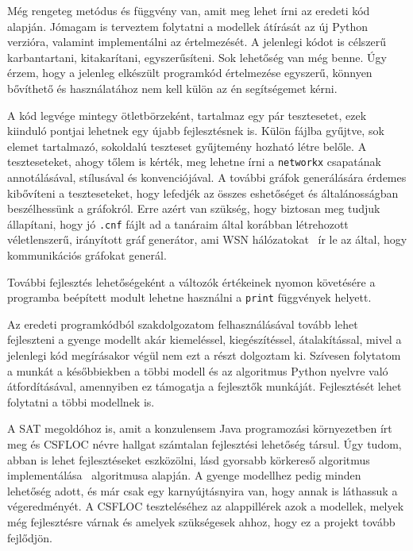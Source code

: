 \documentclass[
]{thesis-ekf}
\theoremstyle{definition}
\theoremstyle{remark}
\begin{document}
	Még rengeteg metódus és függvény van, amit meg lehet írni az eredeti kód~\cite{github-py08} alapján. Jómagam is terveztem folytatni a modellek átírását az új Python verzióra, valamint implementálni az értelmezését. A jelenlegi kódot is célszerű karbantartani, kitakarítani, egyszerűsíteni. Sok lehetőség van még benne. Úgy érzem, hogy a jelenleg elkészült programkód értelmezése egyszerű, könnyen bővíthető és használatához nem kell külön az én segítségemet kérni.
	
	A kód legvége mintegy ötletbörzeként, tartalmaz egy pár tesztesetet, ezek kiinduló pontjai lehetnek egy újabb fejlesztésnek is. Külön fájlba gyűjtve, sok elemet tartalmazó, sokoldalú teszteset gyűjtemény hozható létre belőle. A teszteseteket, ahogy tőlem is kérték, meg lehetne írni a \texttt{networkx} csapatának annotálásával, stílusával és konvenciójával. A további gráfok generálására érdemes kibővíteni a teszteseteket, hogy lefedjék az összes eshetőséget és általánosságban beszélhessünk a gráfokról. Erre azért van szükség, hogy biztosan meg tudjuk állapítani, hogy jó \texttt{.cnf} fájlt ad a tanáraim által korábban létrehozott véletlenszerű, irányított gráf generátor, ami \textsc{WSN} hálózatokat~\cite{am} ír le az által, hogy kommunikációs gráfokat generál.
	
	További fejlesztés lehetőségeként a változók értékeinek nyomon követésére a programba beépített modult lehetne használni a \texttt{print} függvények helyett.
	
	Az eredeti programkódból szakdolgozatom felhasználásával tovább lehet fejleszteni a gyenge modellt akár kiemeléssel, kiegészítéssel, átalakítással, mivel a jelenlegi kód megírásakor végül nem ezt a részt dolgoztam ki. Szívesen folytatom a munkát a későbbiekben a többi modell és az algoritmus Python nyelvre való átfordításával, amennyiben ez támogatja a fejlesztők munkáját. Fejlesztését lehet folytatni a többi modellnek is.

	A \textsc{SAT} megoldóhoz is, amit a konzulensem Java programozási környezetben írt meg és \textsc{CSFLOC} névre hallgat számtalan fejlesztési lehetőség társul. Úgy tudom, abban is lehet fejlesztéseket eszközölni, lásd gyorsabb körkereső algoritmus implementálása~\cite[Johnson]{johnson} algoritmusa alapján. A gyenge modellhez pedig minden lehetőség adott, és már csak egy karnyújtásnyira van, hogy annak is láthassuk a végeredményét.	A \textsc{CSFLOC} teszteléséhez az alappillérek azok a modellek, melyek még fejlesztésre várnak és amelyek szükségesek ahhoz, hogy ez a projekt tovább fejlődjön.
	
\end{document}
